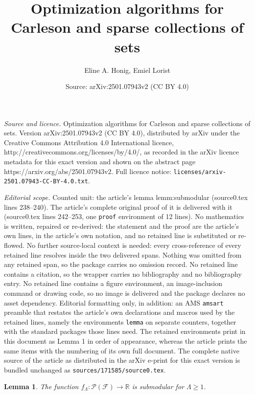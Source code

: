 \documentclass[10pt,a4paper]{amsart}
\title{Optimization algorithms for Carleson and sparse collections of sets}
\author{Eline A. Honig, Emiel Lorist}
\date{Source: arXiv:2501.07943v2 (CC BY 4.0)}
\newtheorem{lemma}{Lemma}
\newcommand{\R}{\ensuremath{\mathbb{R}}}
\newcommand{\mc}{\mathcal}
\begin{document}
\maketitle

\noindent\emph{Source and licence.} Optimization algorithms for Carleson and sparse collections of sets. Version arXiv:2501.07943v2 (CC BY 4.0), distributed by arXiv under the Creative Commons Attribution 4.0 International licence, http://creativecommons.org/licenses/by/4.0/, as recorded in the arXiv licence metadata for this exact version and shown on the abstract page https://arxiv.org/abs/2501.07943v2. Full licence notice: \texttt{licenses/arxiv-2501.07943-CC-BY-4.0.txt}.\par\smallskip

\noindent\textit{Editorial scope.} Counted unit: the article's lemma lemm:submodular (source0.tex lines 238--240). The article's complete original proof of it is delivered with it (source0.tex lines 242--253, one \texttt{proof} environment of 12 lines). No mathematics is written, repaired or re-derived: the statement and the proof are the article's own lines, in the article's own notation, and no retained line is substituted or re-flowed.  No further source-local context is needed: every cross-reference of every retained line resolves inside the two delivered spans.  Nothing was omitted from any retained span, so the package carries no omission record.  No retained line contains a citation, so the wrapper carries no bibliography and no bibliography entry.  No retained line contains a figure environment, an image-inclusion command or drawing code, so no image is delivered and the package declares no asset dependency.  Editorial formatting only, in addition: an AMS \texttt{amsart} preamble that restates the article's own declarations and macros used by the retained lines, namely the environments \texttt{lemma} on separate counters, together with the standard packages those lines need.  The retained environments print in this document as Lemma 1 in order of appearance, whereas the article prints the same items with the numbering of its own full document.  The complete native source of the article as distributed in the arXiv e-print for this exact version is bundled unchanged as \texttt{sources/171585/source0.tex}.
\begin{lemma}\label{lemm:submodular}
 The function $f_\Lambda\colon \mc{P}(\mc{F}) \to \R$ is submodular for $\Lambda \geq 1$.
\end{lemma}
\end{document}
